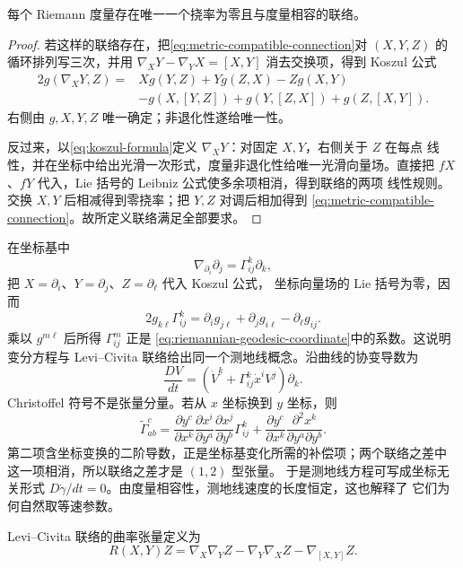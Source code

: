 \begin{theorem}\label{thm:levi-civita}
每个 Riemann 度量存在唯一一个挠率为零且与度量相容的联络。
\end{theorem}
\begin{proof}
若这样的联络存在，把\eqref{eq:metric-compatible-connection}对
$(X,Y,Z)$ 的循环排列写三次，并用
$\nabla_XY-\nabla_YX=[X,Y]$ 消去交换项，得到 Koszul 公式
\begin{equation}\label{eq:koszul-formula}\begin{aligned}
2g(\nabla_XY,Z)={}&Xg(Y,Z)+Yg(Z,X)-Zg(X,Y)\\
&-g(X,[Y,Z])+g(Y,[Z,X])+g(Z,[X,Y]).
\end{aligned}\end{equation}
右侧由 $g,X,Y,Z$ 唯一确定；非退化性遂给唯一性。

反过来，以\eqref{eq:koszul-formula}定义 $\nabla_XY$：对固定 $X,Y$，右侧关于 $Z$ 在每点
线性，并在坐标中给出光滑一次形式，度量非退化性给唯一光滑向量场。直接把
$fX$、$fY$ 代入，Lie 括号的 Leibniz 公式使多余项相消，得到联络的两项
线性规则。交换 $X,Y$ 后相减得到零挠率；把 $Y,Z$ 对调后相加得到
\eqref{eq:metric-compatible-connection}。故所定义联络满足全部要求。
\end{proof}

在坐标基中
\[
 \nabla_{\partial_i}\partial_j=\Gamma^k_{ij}\partial_k,
\]
把 $X=\partial_i$、$Y=\partial_j$、$Z=\partial_\ell$ 代入 Koszul 公式，
坐标向量场的 Lie 括号为零，因而
\[
 2g_{k\ell}\Gamma^k_{ij}
 =\partial_i g_{j\ell}+\partial_jg_{i\ell}-\partial_\ell g_{ij}.
\]
乘以 $g^{m\ell}$ 后所得 $\Gamma^m_{ij}$ 正是
\eqref{eq:riemannian-geodesic-coordinate}中的系数。这说明变分方程与
Levi--Civita 联络给出同一个测地线概念。沿曲线的协变导数为
\[
\frac{DV}{dt}=
 \left(\dot V^k+\Gamma^k_{ij}\dot x^iV^j\right)\partial_k.
\]
Christoffel 符号不是张量分量。若从 $x$ 坐标换到 $y$ 坐标，则
\begin{equation}\label{eq:christoffel-coordinate-change}
 \widetilde\Gamma^c_{ab}
 =\frac{\partial y^c}{\partial x^k}
   \frac{\partial x^i}{\partial y^a}
   \frac{\partial x^j}{\partial y^b}\Gamma^k_{ij}
 +\frac{\partial y^c}{\partial x^k}
   \frac{\partial^2x^k}{\partial y^a\partial y^b}.
\end{equation}
第二项含坐标变换的二阶导数，正是坐标基变化所需的补偿项；两个联络之差中
这一项相消，所以联络之差才是 $(1,2)$ 型张量。
于是测地线方程可写成坐标无关形式
$D\dot\gamma/dt=0$。由度量相容性，测地线速度的长度恒定，这也解释了
它们为何自然取等速参数。

\begin{definition}
Levi--Civita 联络的曲率张量定义为
\[
 R(X,Y)Z=\nabla_X\nabla_YZ-\nabla_Y\nabla_XZ-\nabla_{[X,Y]}Z.
\]
\end{definition}

